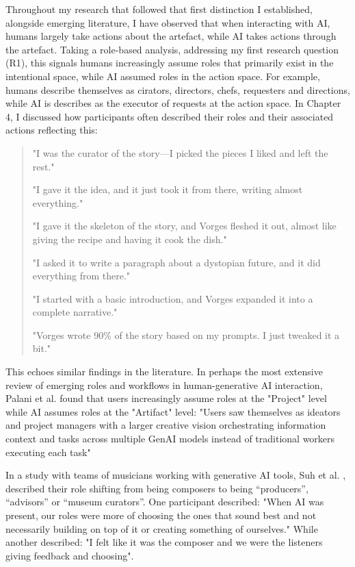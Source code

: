 Throughout my research that followed that first distinction I established, alongside emerging literature, I have observed that when interacting with AI, humans largely take actions about the artefact, while AI takes actions through the artefact. Taking a role-based analysis, addressing my first research question (R1), this signals humans increasingly assume roles that primarily exist in the intentional space, while AI assumed roles in the action space. For example, humans describe themselves as cirators, directors, chefs, requesters and directions, while AI is describes as the executor of requests at the action space. In Chapter 4, I discussed how participants often described their roles and their associated actions reflecting this:

\begin{quote}
"I was the curator of the story—I picked the pieces I liked and left the rest."

"I gave it the idea, and it just took it from there, writing almost everything."

"I gave it the skeleton of the story, and Vorges fleshed it out, almost like giving the recipe and having it cook the dish." 

"I asked it to write a paragraph about a dystopian future, and it did everything from there." 

"I started with a basic introduction, and Vorges expanded it into a complete narrative." 

"Vorges wrote 90\% of the story based on my prompts. I just tweaked it a bit."
\end{quote}

This echoes similar findings in the literature. In perhaps the most extensive review of emerging roles and workflows in human-generative AI interaction, Palani et al. \cite{Palani2024-on} found that users increasingly assume roles at the "Project" level while AI assumes roles at the "Artifact" level: "Users saw themselves as ideators and project managers with a larger creative vision orchestrating information context and tasks across multiple GenAI models instead of traditional workers executing each task"

In a study with teams of musicians working with generative AI tools, Suh et al. \cite{Suh2021-cj}, described their role shifting from being composers to being “producers”, “advisors” or “museum curators”. One participant described: "When AI was present, our roles were more of choosing the ones that sound best and not necessarily building on top of it or creating something of ourselves." While another described: "I felt like it was the composer and we were the listeners giving feedback and choosing". 


